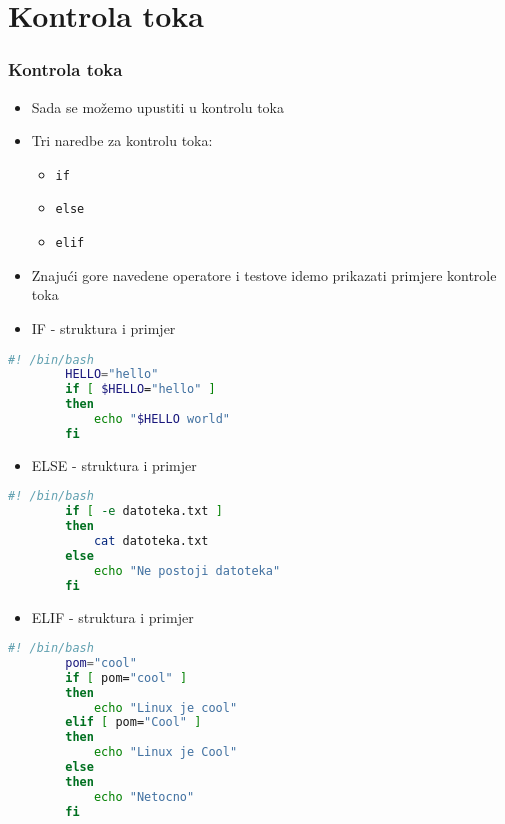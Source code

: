 \documentclass{beamer}
\newcommand{\shell}[1]{\texttt{#1}}
\begin{document}
\section{Kontrola toka}
\begin{frame}
\frametitle{Kontrola toka}
\begin{itemize}
	\item Sada se možemo upustiti u kontrolu toka
	\item Tri naredbe za kontrolu toka:
	\begin{itemize}
		\item \shell{if}
		\item \shell{else}
		\item \shell{elif}
	\end{itemize}
	\item Znajući gore navedene operatore i testove idemo prikazati primjere kontrole toka
\end{itemize}
\end{frame}
\begin{itemize}
	\item IF - struktura i primjer
\end{itemize}
	\begin{lstlisting}[language=bash]
		#! /bin/bash
		HELLO="hello"
		if [ $HELLO="hello" ]
		then
			echo "$HELLO world"
		fi
	\end{lstlisting}
\begin{itemize}
	\item ELSE - struktura i primjer
\end{itemize}
	
	\begin{lstlisting}[language=bash]
		#! /bin/bash
		if [ -e datoteka.txt ]
		then
			cat datoteka.txt
		else
			echo "Ne postoji datoteka"
		fi
	\end{lstlisting}
\begin{itemize}
	\item ELIF - struktura i primjer
\end{itemize}
	
	\begin{lstlisting}[language=bash]
		#! /bin/bash
		pom="cool"
		if [ pom="cool" ]
		then
			echo "Linux je cool"
		elif [ pom="Cool" ]
		then 
			echo "Linux je Cool"
		else
		then
			echo "Netocno"
		fi
	\end{lstlisting}
\end{document}
